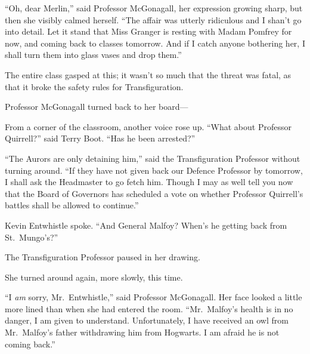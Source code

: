 ``Oh, dear Merlin,'' said Professor McGonagall, her expression growing
sharp, but then she visibly calmed herself. ``The affair was utterly
ridiculous and I shan't go into detail. Let it stand that Miss Granger
is resting with Madam Pomfrey for now, and coming back to classes
tomorrow. And if I catch anyone bothering her, I shall turn them into
glass vases and drop them.''

The entire class gasped at this; it wasn't so much that the threat was
fatal, as that it broke the safety rules for Transfiguration.

Professor McGonagall turned back to her board---

From a corner of the classroom, another voice rose up. ``What about
Professor Quirrell?'' said Terry Boot. ``Has he been arrested?''

``The Aurors are only detaining him,'' said the Transfiguration
Professor without turning around. ``If they have not given back our
Defence Professor by tomorrow, I shall ask the Headmaster to go fetch
him. Though I may as well tell you now that the Board of Governors has
scheduled a vote on whether Professor Quirrell's battles shall be
allowed to continue.''

Kevin Entwhistle spoke. ``And General Malfoy? When's he getting back
from St.~Mungo's?''

The Transfiguration Professor paused in her drawing.

She turned around again, more slowly, this time.

``I \emph{am} sorry, Mr.~Entwhistle,'' said Professor McGonagall. Her
face looked a little more lined than when she had entered the room.
``Mr.~Malfoy's health is in no danger, I am given to understand.
Unfortunately, I have received an owl from Mr.~Malfoy's father
withdrawing him from Hogwarts. I am afraid he is not coming back.''
